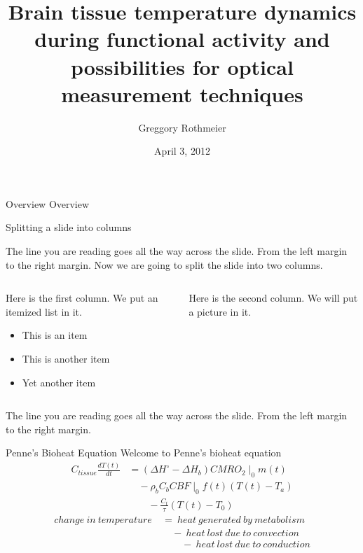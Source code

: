 \documentclass{beamer}
\title{Brain tissue temperature dynamics during functional activity and possibilities for optical measurement techniques}
\author{Greggory Rothmeier}
\institute{
  Department of Physics and Astronomy\\
  Georgia State University\\
  Atlanta, GA 30303\\
}
\date{April 3, 2012}
\begin{document}
  
{
\begin{frame}[plain]
\titlepage
\end{frame} 
}

\begin{frame}{Overview}
  Overview
\end{frame} 

\begin{frame}{Splitting a slide into columns}

The line you are reading goes all the way across the slide.
From the left margin to the right margin.  Now we are going
to split the slide into two columns.
\bigskip

\begin{columns}
  \begin{column}{0.5\textwidth}
    Here is the first column.  We put an itemized list in it.
    \begin{itemize}
      \item This is an item
      \item This is another item
      \item Yet another item
    \end{itemize}
  \end{column}

  \begin{column}{0.3\textwidth}
    Here is the second column.  We will put a picture in it.
  \end{column}
\end{columns}
\bigskip

The line you are reading goes all the way across the slide.
From the left margin to the right margin.

\end{frame}

\begin{frame}{Penne's Bioheat Equation}
  Welcome to Penne's bioheat equation~
  \begin{align}
    C_{tissue} \frac{dT(t)}{dt} &= (\Delta H^{\circ}-\Delta H_{b}) CMRO_{2}\mid_{0} m(t) \nonumber \\
    &\quad {} - \rho_{b} C_{b} CBF\mid_{0} f(t) (T(t) - T_{a}) \nonumber \\
    &\qquad {} - \frac{C_{t}}{\tau} (T(t)-T_{0}) \nonumber
  \end{align}
  \bigskip
  \begin{align}    
    change\ in\ temperature\ &=\ heat\ generated\ by\ metabolism\ \nonumber \\
    &\quad {} -\ heat\ lost\ due\ to\ convection\ \nonumber \\
    &\qquad {} -\ heat\ lost\ due\ to\ conduction \nonumber
  \end{align}
  
\end{frame}
\end{document}
